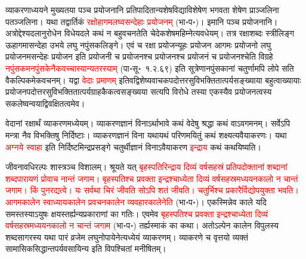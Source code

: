 \begin{sloppypar}\justifying\noindent\hspace{10mm} व्याकरणाध्ययने मुख्यतया पञ्च प्रयोजनानि प्रतिपादितान्यशेष\-विद्या\-विशेषेण भगवता शेषेण प्राञ्जलिना पतञ्जलिना। यथा तद्वार्तिकं \textcolor{red}{रक्षोहागमलघ्वसन्देहाः प्रयोजनम्} (भा॰प॰)। इमानि पञ्च प्रयोजनानि। अत्रोद्देश्य\-दलानुरोधेन विधेय\-दले कथं न बहु\-वचनतेति चेदेक\-शेष\-महिम्नेत्यवधेयम्। तत्र रक्षा\-शब्दः स्त्रीलिङ्ग ऊहागमासन्देहा उभये लघु नपुंसकलिङ्गे। एवं च रक्षा प्रयोजन्यूहः प्रयोजन आगमः प्रयोजनो लघु प्रयोजनमसन्देहः प्रयोजन इति प्रयोजनी च प्रयोजनश्च प्रयोजनश्च प्रयोजनं च प्रयोजनश्चेति विग्रहे \textcolor{red}{नपुंसकमनपुंसकेनैकवच्चास्यान्यतरस्याम्} (पा॰सू॰~१.२.६९) इति सूत्रेणानपुंसकानां चतुर्णामपि लोपे सति वैकल्पिकमेकवचनम्। यद्वा \textcolor{red}{वेदाः प्रमाणम्} इतिवद्विशेष्य\-वाचक\-पदोत्तर\-सु\-विभक्ति\-तात्पर्य\-सङ्ख्याया बहुत्वाख्यायाः प्रयोजन\-पदोत्तर\-सु\-विभक्ति\-तात्पर्य\-ग्राहकैकत्व\-सङ्ख्यया सत्यपि विरोधे तस्या एकस्यैव प्रयोजनत्वस्य सकलेष्वन्वयाद्विवक्षितत्वमेव।\end{sloppypar}
\begin{sloppypar}\justifying\noindent\hspace{10mm} वेदानां रक्षार्थं व्याकरणमध्येयम्। व्याकरण\-ज्ञानं विनाऽर्थाभावे कथं वेदेषु श्रद्धा कथं वाऽवगमनम्। सर्वेऽपि मन्त्रा नैव विभक्तिषु निर्दिष्टाः। व्याकरण\-ज्ञानं विना यथायथं परिणमयितुं कथं शक्ष्यत्यवैयाकरणः। यथा \textcolor{red}{अग्नये स्वाहा} इति निर्दिष्टमिन्द्र\-प्रसङ्गे चतुर्थी\-ज्ञानं विनाऽवैयाकरण \textcolor{red}{इन्द्राय} कथं कथयिष्यति।\end{sloppypar}
\begin{sloppypar}\justifying\noindent\hspace{10mm} जीवनावधिरल्पः शास्त्रञ्च विशालम्। श्रूयते यत् \textcolor{red}{बृहस्पतिरिन्द्राय दिव्यं वर्ष\-सहस्रं प्रतिपदोक्तानां शब्दानां शब्द\-पारायणं प्रोवाच नान्तं जगाम। बृहस्पतिश्च प्रवक्ता इन्द्रश्चाध्येता दिव्यं वर्षसहस्रमध्ययन\-कालो न चान्तं जगाम। किं पुनरद्यत्वे। यः सर्वथा चिरं जीवति सोऽपि शतं जीवति। चतुर्भिश्च प्रकारैर्विद्योपयुक्ता भवति। आगम\-कालेन स्वाध्याय\-कालेन प्रवचन\-कालेन व्यवहार\-कालेनेति} (भा॰प॰)। एकस्मिन्नेव काले यदि समस्तस्याऽयुषः क्षयस्तर्ह्यन्य\-प्रकाराणां का गतिः। एवमेव \textcolor{red}{बृहस्पतिश्च प्रवक्ता इन्द्रश्चाध्येता दिव्यं वर्ष\-सहस्रमध्ययन\-कालो न चान्तं जगाम} (भा॰प॰) तर्ह्यस्माकं का कथा। अतोऽल्पेन कालेन विपुलस्य शब्द\-सागरस्य यथा पारं व्रजेम लघुनोपायेनेत्यध्येयं व्याकरणम्। व्याकरणे च वृत्तयो व्यक्तं सामासिक\-सिद्धान्त\-पर्यवसायिन्य इति विपश्चितां मनीषितम्।\end{sloppypar}
